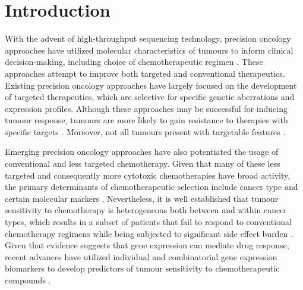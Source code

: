 \documentclass[10pt, letterpaper, twocolumn]{article}
\begin{document}
\section{Introduction}
With the advent of high-throughput sequencing technology, precision oncology approaches have utilized molecular characteristics of tumours to inform clinical decision-making, including choice of chemotherapeutic regimen \cite{drugml, patient_resps}. These approaches attempt to improve both targeted and conventional therapeutics. Existing precision oncology approaches have largely focused on the development of targeted therapeutics, which are selective for specific genetic aberrations and expression profiles. Although these approaches may be successful for inducing tumour response, tumours are more likely to gain resistance to therapies with specific targets \cite{small_mol}. Moreover, not all tumours present with targetable features \cite{small_mol}.

Emerging precision oncology approaches have also potentiated the usage of conventional and less targeted chemotherapy. Given that many of these less targeted and consequently more cytotoxic chemotherapies have broad activity, the primary determinants of chemotherapeutic selection include cancer type and certain molecular markers \cite{adverse}. Nevertheless, it is well established that tumour sensitivity to chemotherapy is heterogeneous both between and within cancer types, which results in a subset of patients that fail to respond to conventional chemotherapy regimens while being subjected to significant side effect burden \cite{adjuvant}. Given that evidence suggests that gene expression can mediate drug response, recent advances have utilized individual and combinatorial gene expression biomarkers to develop predictors of tumour sensitivity to chemotherapeutic compounds \cite{integrated}.
\end{document}
